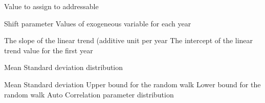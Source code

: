  {}
 {}
 {}
 {}
 {}
\par\textbf{}\par
{} {Value to assign to addressable}
\par\textbf{}\par
{} {Shift parameter}
 {Values of exogeneous variable for each year}
\par\textbf{}\par
{} {The slope of the linear trend (additive unit per year}
 {The intercept of the linear trend value for the first year}
\par\textbf{}\par
{} {Mean}
 {Standard deviation}
 {distribution}
\par\textbf{}\par
{} {Mean}
 {Standard deviation}
 {Upper bound for the random walk}
 {Lower bound for the random walk}
 {Auto Correlation parameter}
 {distribution}
